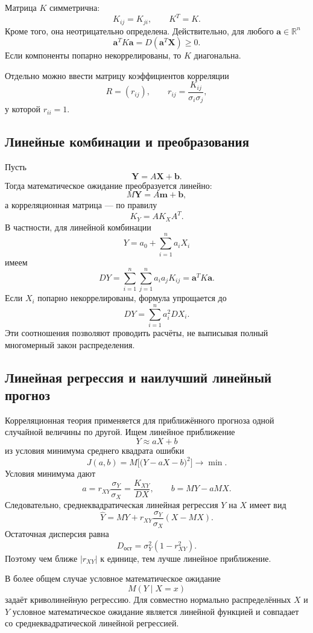 Матрица $K$ симметрична:
\[
    K_{ij}=K_{ji},\qquad K^T=K.
\]
Кроме того, она неотрицательно определена. Действительно, для любого
$\mathbf a\in\mathbb R^n$
\[
    \mathbf a^T K\mathbf a
    =D(\mathbf a^T\mathbf X)\geq0.
\]
Если компоненты попарно некоррелированы, то $K$ диагональна.

Отдельно можно ввести матрицу коэффициентов корреляции
\[
    R=(r_{ij}),\qquad
    r_{ij}=\frac{K_{ij}}{\sigma_i\sigma_j},
\]
у которой $r_{ii}=1$.

\subsection{Линейные комбинации и преобразования}

Пусть
\[
    \mathbf Y=A\mathbf X+\mathbf b.
\]
Тогда математическое ожидание преобразуется линейно:
\[
    M\mathbf Y=A\mathbf m+\mathbf b,
\]
а корреляционная матрица --- по правилу
\[
    K_Y=A K_X A^T.
\]
В частности, для линейной комбинации
\[
    Y=a_0+\sum_{i=1}^n a_iX_i
\]
имеем
\[
    DY=\sum_{i=1}^n\sum_{j=1}^n a_i a_j K_{ij}
      =\mathbf a^T K\mathbf a.
\]
Если $X_i$ попарно некоррелированы, формула упрощается до
\[
    DY=\sum_{i=1}^n a_i^2 DX_i.
\]
Эти соотношения позволяют проводить расчёты, не выписывая полный многомерный
закон распределения.

\subsection{Линейная регрессия и наилучший линейный прогноз}

Корреляционная теория применяется для приближённого прогноза одной случайной
величины по другой. Ищем линейное приближение
\[
    Y\approx aX+b
\]
из условия минимума среднего квадрата ошибки
\[
    J(a,b)=M\bigl[\bigl(Y-aX-b\bigr)^2\bigr]\to\min.
\]
Условия минимума дают
\[
    a=r_{XY}\frac{\sigma_Y}{\sigma_X}
      =\frac{K_{XY}}{DX},
    \qquad
    b=MY-aMX.
\]
Следовательно, среднеквадратическая линейная регрессия $Y$ на $X$ имеет вид
\[
    \widehat Y
    =MY+r_{XY}\frac{\sigma_Y}{\sigma_X}(X-MX).
\]
Остаточная дисперсия равна
\[
    D_{\mathrm{ост}}=\sigma_Y^2(1-r_{XY}^2).
\]
Поэтому чем ближе $|r_{XY}|$ к единице, тем лучше линейное приближение.

В более общем случае условное математическое ожидание
\[
    M(Y\mid X=x)
\]
задаёт криволинейную регрессию. Для совместно нормально распределённых
$X$ и $Y$ условное математическое ожидание является линейной функцией и
совпадает со среднеквадратической линейной регрессией.

